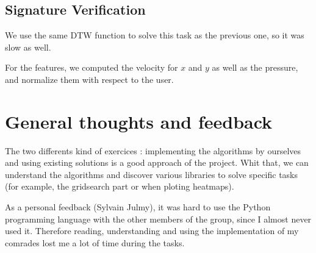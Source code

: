 \documentclass[a4paper,11pt]{report}
\begin{document}
\subsection*{Signature Verification}

We use the same DTW function to solve this task as the previous one, so it was
slow as well.

For the features, we computed the velocity for $x$ and $y$ as well as the
pressure, and normalize them with respect to the user.

\section*{General thoughts and feedback}

The two differents kind of exercices : implementing the algorithms by ourselves and using
existing solutions is a good approach of the project. Whit that, we can
understand the algorithms and discover various libraries to solve specific tasks
(for example, the gridsearch part or when ploting heatmaps).

As a personal feedback (Sylvain Julmy), it was hard to use the Python
programming language with the other members of the group, since I almost never
used it. Therefore reading, understanding and using the implementation of my
comrades lost me a lot of time during the tasks.
\end{document}
